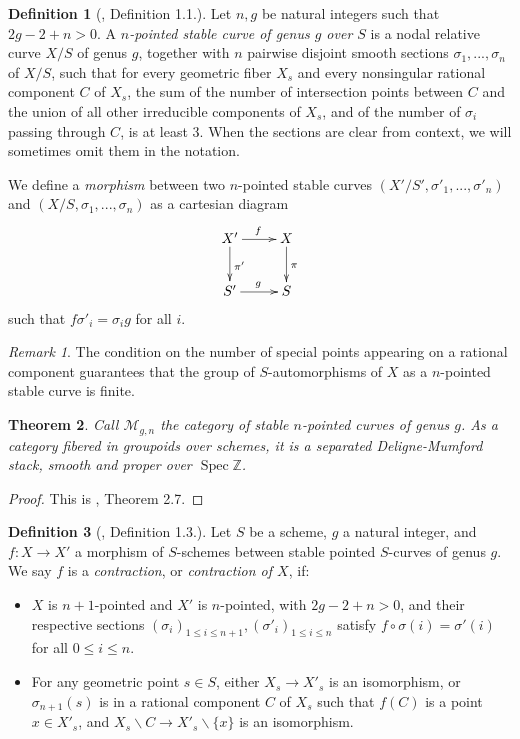 \documentclass[a4paper,10pt,twoside]{article}
\newcommand{\ra}{\rightarrow}
\newcommand{\Z}{\mathbb{Z}}
\DeclareMathOperator{\spec}{Spec}
\newtheorem{thm}{Theorem}[section]
\theoremstyle{definition}
\newtheorem{defi}[thm]{Definition}
\theoremstyle{remark}
\newtheorem{rem}{Remark}[thm]
\begin{document}
\begin{defi}[\cite{Knudsen}, Definition 1.1.]
Let $n,g$ be natural integers such that $2g-2+n>0$. A \emph{$n$-pointed stable curve of genus $g$ over $S$} is a nodal relative curve $X/S$ of genus $g$, together with $n$ pairwise disjoint smooth sections $\sigma_1,...,\sigma_n$ of $X/S$, such that for every geometric fiber $X_s$ and every nonsingular rational component $C$ of $X_s$, the sum of the number of intersection points between $C$ and the union of all other irreducible components of $X_s$, and of the number of $\sigma_i$ passing through $C$, is at least $3$. When the sections are clear from context, we will sometimes omit them in the notation.

We define a \emph{morphism} between two $n$-pointed stable curves $(X'/S',\sigma'_1,...,\sigma'_n)$ and $(X/S,\sigma_1,...,\sigma_n)$ as a cartesian diagram
\[
\xymatrix{
X'\ar[r]^f\ar[d]^{\pi'}&X\ar[d]^\pi\\
S'\ar[r]^g&S
}
\]
such that $f\sigma'_i=\sigma_ig$ for all $i$.
\end{defi}

\begin{rem}
The condition on the number of special points appearing on a rational component guarantees that the group of $S$-automorphisms of $X$ as a $n$-pointed stable curve is finite.
\end{rem}


\begin{thm}
Call $\mathcal{M}_{g,n}$ the category of stable $n$-pointed curves of genus $g$. As a category fibered in groupoids over schemes, it is a separated Deligne-Mumford stack, smooth and proper over $\spec\Z$.
\end{thm}

\begin{proof}
This is \cite{Knudsen}, Theorem 2.7.
\end{proof}


\begin{defi}[\cite{Knudsen}, Definition 1.3.]
Let $S$ be a scheme, $g$ a natural integer, and $f:X\ra X'$ a morphism of $S$-schemes between stable pointed $S$-curves of genus $g$. We say $f$ is a \emph{contraction}, or \emph{contraction of $X$}, if:
\begin{itemize}
\item $X$ is $n+1$-pointed and $X'$ is $n$-pointed, with $2g-2+n>0$, and their respective sections $(\sigma_i)_{1\leq i\leq n+1}, (\sigma'_i)_{1\leq i\leq n}$ satisfy $f\circ\sigma(i)=\sigma'(i)$ for all $0\leq i\leq n$.
\item For any geometric point $s\in S$, either $X_s\ra X'_s$ is an isomorphism, or $\sigma_{n+1}(s)$ is in a rational component $C$ of $X_s$ such that $f(C)$ is a point $x\in X'_s$, and $X_s\backslash C\ra X'_s\backslash\{x\}$ is an isomorphism.
\end{itemize}
\end{defi}
\end{document}
